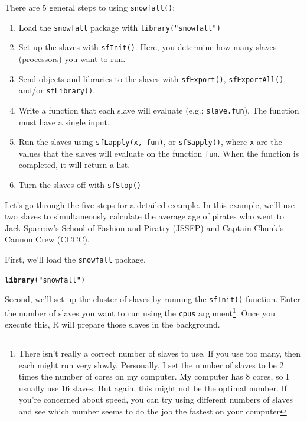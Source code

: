 \documentclass{tufte-book}\usepackage[]{graphicx}\usepackage[]{color}
\makeatletter
\newcommand{\hlstr}[1]{\textcolor[rgb]{0.192,0.494,0.8}{#1}}%
\newcommand{\hlstd}[1]{\textcolor[rgb]{0.345,0.345,0.345}{#1}}%
\newcommand{\hlkwd}[1]{\textcolor[rgb]{0.737,0.353,0.396}{\textbf{#1}}}%
\newenvironment{kframe}{%
 \def\at@end@of@kframe{}%
 \ifinner\ifhmode%
  \def\at@end@of@kframe{\end{minipage}}%
  \begin{minipage}{\columnwidth}%
 \fi\fi%
 \def\FrameCommand##1{\hskip\@totalleftmargin \hskip-\fboxsep
 \colorbox{shadecolor}{##1}\hskip-\fboxsep
     \hskip-\linewidth \hskip-\@totalleftmargin \hskip\columnwidth}%
 \MakeFramed {\advance\hsize-\width
   \@totalleftmargin\z@ \linewidth\hsize
   \@setminipage}}%
 {\par\unskip\endMakeFramed%
 \at@end@of@kframe}
\newenvironment{knitrout}{}{} %
\makeatother
\begin{document}
There are 5 general steps to using \texttt{snowfall()}:

\begin{enumerate}

\item Load the \texttt{snowfall} package with \texttt{library("snowfall")}
\item Set up the slaves with \texttt{sfInit()}. Here, you determine how many slaves (processors) you want to run.
\item Send objects and libraries to the slaves with \texttt{sfExport()}, \texttt{sfExportAll()}, and/or \texttt{sfLibrary()}.
\item Write a function that each slave will evaluate (e.g.; \texttt{slave.fun}). The function must have a single input.
\item Run the slaves using \texttt{sfLapply(x, fun)}, or \texttt{sfSapply()}, where \texttt{x} are the values that the slaves will evaluate on the function \texttt{fun}. When the function is completed, it will return a list.
\item Turn the slaves off with \texttt{sfStop()}

\end{enumerate}

Let's go through the five steps for a detailed example. In this example, we'll use two slaves to simultaneously calculate the average age of pirates who went to Jack Sparrow's School of Fashion and Piratry (JSSFP) and Captain Chunk's Cannon Crew (CCCC).

First, we'll load the \texttt{snowfall} package.

\begin{knitrout}
\color{fgcolor}\begin{kframe}
\begin{alltt}
\hlkwd{library}\hlstd{(}\hlstr{"snowfall"}\hlstd{)}
\end{alltt}


{\ttfamily\noindent\itshape\color{messagecolor}{\#\# Loading required package: snow}}\end{kframe}
\end{knitrout}

Second, we'll set up the cluster of slaves by running the \texttt{sfInit()} function. Enter the number of slaves you want to run using the \texttt{cpus} argument\footnote{There isn't really a correct number of slaves to use. If you use too many, then each might run very slowly. Personally, I set the number of slaves to be 2 times the number of cores on my computer. My computer has 8 cores, so I usually use 16 slaves. But again, this might not be the optimal number. If you're concerned about speed, you can try using different numbers of slaves and see which number seems to do the job the fastest on your computer}. Once you execute this, R will prepare those slaves in the background.
\end{document}
